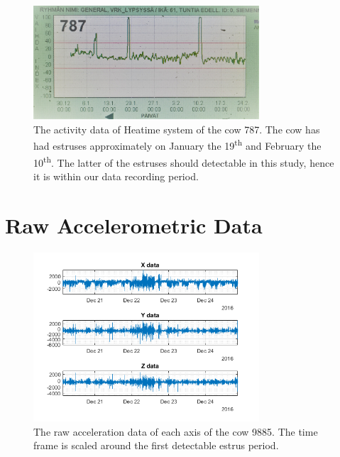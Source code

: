 \begin{figure}[htb]
\centering
\includegraphics[width = 0.75\textwidth]{figures/heatime_kiima_787}
\caption{The activity data of Heatime system of the cow 787. The cow has had estruses approximately on January the 19\textsuperscript{th} and February the 10\textsuperscript{th}. The latter of the estruses should detectable in this study, hence it is within our data recording period.}
\label{heatime_kiima_787}
\end{figure}



\clearpage
\section{Raw Accelerometric Data}

\begin{figure}[htb]
\centering
\includegraphics[width = 0.75\textwidth]{figures/kiimadata_9885_1.png}
\caption{The raw acceleration data of each axis of the cow 9885. The time frame is scaled around the first detectable estrus period. }
\label{kiimadata_9885_1}
\end{figure}

